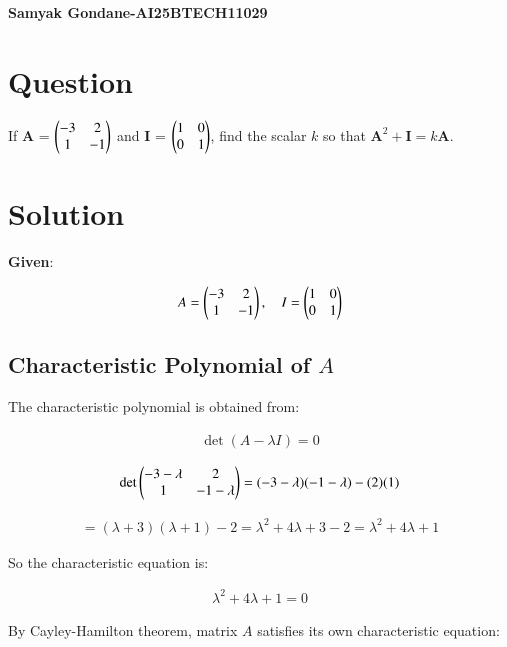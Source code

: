\documentclass{article}
\begin{document}
\begin{center}
\large
    \textbf{Samyak Gondane-AI25BTECH11029}
\end{center}
\date{}

\section*{Question}
If $\textbf{A}$ = $\begin{pmatrix}-3 & 2 \\ 1 & -1\end{pmatrix}$ and $\textbf{I}$ = $\begin{pmatrix}1 & 0 \\ 0 & 1\end{pmatrix}$, find the scalar $k$ so that $\textbf{A}^2 + \textbf{I} = k\textbf{A}$.

\section*{Solution}

\textbf{Given}:

\begin{align}
A = \begin{pmatrix}-3 & 2 \\ 1 & -1\end{pmatrix}, \quad
I = \begin{pmatrix}1 & 0 \\ 0 & 1\end{pmatrix}
\end{align}


\subsection*{Characteristic Polynomial of $A$}

The characteristic polynomial is obtained from:

\begin{align}
\det(A - \lambda I) = 0
\end{align}

\begin{align}
\det\begin{pmatrix}-3 - \lambda & 2 \\ 1 & -1 - \lambda\end{pmatrix}
= (-3 - \lambda)(-1 - \lambda) - (2)(1)
\end{align}

\begin{align}
= (\lambda + 3)(\lambda + 1) - 2 = \lambda^2 + 4\lambda + 3 - 2 = \lambda^2 + 4\lambda + 1
\end{align}

So the characteristic equation is:

\begin{align}
\lambda^2 + 4\lambda + 1 = 0
\end{align}

By Cayley-Hamilton theorem, matrix $A$ satisfies its own characteristic equation:
\end{document}
